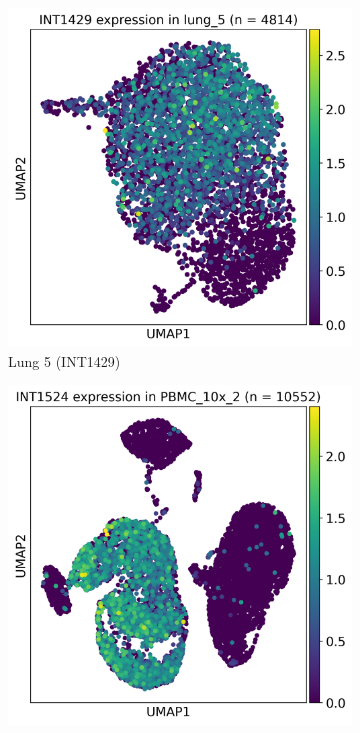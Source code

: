 \begin{figure}[htbp]
    \centering
    \begin{subfigure}{0.45\textwidth}
        \centering
        \includegraphics[width=\textwidth]{images/intergenicSpecificExamples/INT1429_lung_5.png}
        \caption{Lung 5 (INT1429)}
    \end{subfigure}
    \hfill
    \begin{subfigure}{0.45\textwidth}
        \centering
        \includegraphics[width=\textwidth]{images/intergenicSpecificExamples/INT1524_PBMC_10x_2.png}

\end{subfigure}
\end{figure}
